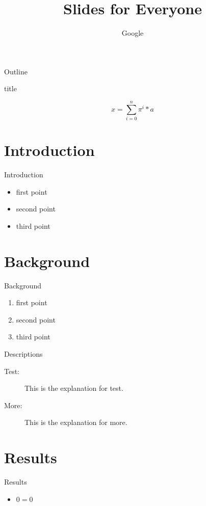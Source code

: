 \documentclass[aspectratio=169]{beamer}
\title{Slides for Everyone}
\author{Google}
\newenvironment{mybox}{
  \begin{beamercolorbox}[sep=0pt,center,shadow=true,rounded=true]{title}
}{
  \end{beamercolorbox}
}
\begin{document}
  \frame{\titlepage}

  \begin{frame}{Outline}
    \tableofcontents
  \end{frame}

  \begin{frame}
    \begin{mybox}
      \[
        x = \sum_{i=0}^n \pi^i * a
      \]
    \end{mybox}
  \end{frame}

  \section{Introduction}

  \begin{frame}{Introduction}
    \begin{itemize}
      \item first point
      \item second point
      \item third point
    \end{itemize}
  \end{frame}

  \section{Background}

  \begin{frame}{Background}
    \begin{enumerate}
      \item first point
      \item second point
      \item third point
    \end{enumerate}
  \end{frame}

  \begin{frame}{Descriptions}
    \begin{description}
      \item[Test:] This is the explanation for test.
      \pause
      \item[More:] This is the explanation for more.
    \end{description}
  \end{frame}

  \section{Results}

  \begin{frame}{Results}
    \begin{itemize}
      \item $0 = 0$
    \end{itemize}
  \end{frame}
\end{document}
